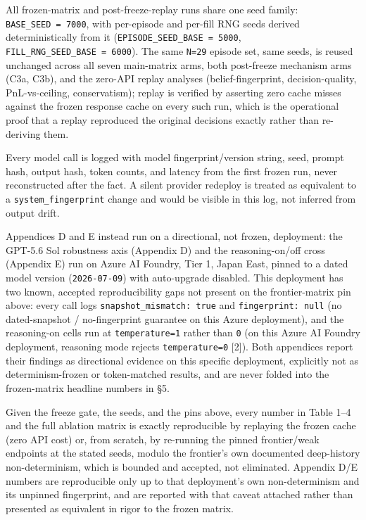 \documentclass[
  11pt,
]{article}
\begin{document}
All frozen-matrix and post-freeze-replay runs share one seed family: \texttt{BASE\_SEED\ =\ 7000}, with per-episode and per-fill RNG seeds derived deterministically from it (\texttt{EPISODE\_SEED\_BASE\ =\ 5000}, \texttt{FILL\_RNG\_SEED\_BASE\ =\ 6000}). The same \texttt{N=29} episode set, same seeds, is reused unchanged across all seven main-matrix arms, both post-freeze mechanism arms (C3a, C3b), and the zero-API replay analyses (belief-fingerprint, decision-quality, PnL-vs-ceiling, conservatism); replay is verified by asserting zero cache misses against the frozen response cache on every such run, which is the operational proof that a replay reproduced the original decisions exactly rather than re-deriving them.

Every model call is logged with model fingerprint/version string, seed, prompt hash, output hash, token counts, and latency from the first frozen run, never reconstructed after the fact. A silent provider redeploy is treated as equivalent to a \texttt{system\_fingerprint} change and would be visible in this log, not inferred from output drift.

Appendices D and E instead run on a directional, not frozen, deployment: the GPT-5.6 Sol robustness axis (Appendix D) and the reasoning-on/off cross (Appendix E) run on Azure AI Foundry, Tier 1, Japan East, pinned to a dated model version (\texttt{2026-07-09}) with auto-upgrade disabled. This deployment has two known, accepted reproducibility gaps not present on the frontier-matrix pin above: every call logs \texttt{snapshot\_mismatch:\ true} and \texttt{fingerprint:\ null} (no dated-snapshot / no-fingerprint guarantee on this Azure deployment), and the reasoning-on cells run at \texttt{temperature=1} rather than \texttt{0} (on this Azure AI Foundry deployment, reasoning mode rejects \texttt{temperature=0} {[}2{]}). Both appendices report their findings as directional evidence on this specific deployment, explicitly not as determinism-frozen or token-matched results, and are never folded into the frozen-matrix headline numbers in §5.

Given the freeze gate, the seeds, and the pins above, every number in Table 1--4 and the full ablation matrix is exactly reproducible by replaying the frozen cache (zero API cost) or, from scratch, by re-running the pinned frontier/weak endpoints at the stated seeds, modulo the frontier's own documented deep-history non-determinism, which is bounded and accepted, not eliminated. Appendix D/E numbers are reproducible only up to that deployment's own non-determinism and its unpinned fingerprint, and are reported with that caveat attached rather than presented as equivalent in rigor to the frozen matrix.
\end{document}
